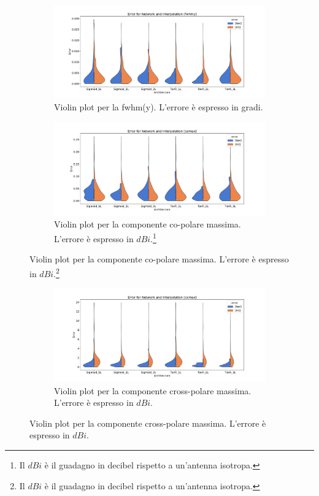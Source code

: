 \documentclass[12pt,a4paper,final]{book}
\begin{document}
\begin{figure}[!ht]\ContinuedFloat
	\vspace{4cm}
	\begin{subfigure}{\textwidth}
		\centering
		\includegraphics[width=\linewidth]{../figures/violin_plot_fwhmy.pdf}
		\caption{Violin plot per la fwhm(y). L'errore è espresso in gradi.}
		\label{violin_fwhmy}
	\end{subfigure}
	\newline
	\newline
	\newline
	\newline
	\begin{subfigure}{\textwidth}
	    \centering
	    \includegraphics[width=\linewidth]{../figures/violin_plot_comax.pdf}
	    \caption{Violin plot per la componente co-polare massima. L'errore è espresso in $dBi$.\footnote{Il $dBi$ è il guadagno in decibel rispetto a un'antenna isotropa.}}
	    \label{violin_comax}
	\end{subfigure}
\end{figure}
\newpage
\begin{figure}[!t]\ContinuedFloat
	\begin{subfigure}{\textwidth}
		\centering
	    \includegraphics[width=\linewidth]{../figures/violin_plot_cxmax.pdf}
	    \caption{Violin plot per la componente cross-polare massima. L'errore è espresso in $dBi$.}
	    \label{violin_cxmax}
	\end{subfigure}
\end{figure}
\end{document}
